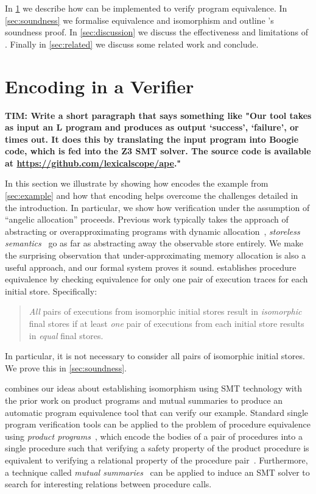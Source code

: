 \documentclass[runningheads,a4paper]{llncs}
\begin{document}
In \cref{sec:impl} we describe how \metho{} can be implemented to verify program equivalence. In \cref{sec:soundness} we formalise equivalence and isomorphism and outline \metho{}'s soundness proof. In \cref{sec:discussion} we discuss the effectiveness and limitations of \metho{}. Finally in \cref{sec:related} we discuss some related work and conclude.

\section{Encoding in a Verifier}\label{sec:impl}


{\bf TIM: Write a short paragraph that says something like "Our tool \tool{}  takes as input an L program  and produces as output `success', `failure', or times out. It does this by translating the input program into Boogie code, which is fed into the Z3 SMT solver. The source code is available at \url{https://github.com/lexicalscope/ape}."} 

In this section we illustrate \metho{} by showing how \tool{} encodes the example from \cref{sec:example} and how that encoding helps overcome the challenges detailed in the introduction. In particular, we show how verification under the assumption of ``angelic allocation'' proceeds.
Previous work typically takes the approach of abstracting or overapproximating programs with dynamic allocation~\cite{Tennent2000,Koutavas2006,Benton2007,Tzevelekos2012}, \emph{storeless semantics}~\cite{Bozga2003} go as far as abstracting away the observable store entirely. We make the surprising observation that under-approximating memory allocation is also a useful approach, and our formal system proves it sound. \metho{} establishes procedure equivalence by checking equivalence for only one pair of execution traces for each initial store. Specifically: \begin{quote}\emph{All} pairs of executions from isomorphic initial stores result in \emph{isomorphic} final stores if at least \emph{one} pair of executions from each initial store results in \emph{equal} final stores.\end{quote} In particular, it is not necessary to consider all pairs of isomorphic initial stores. We prove this in \cref{sec:soundness}.

\metho{} combines our ideas about establishing isomorphism using SMT technology with the prior work on product programs and mutual summaries to produce an automatic program equivalence tool that can verify our example. Standard single program verification tools can be applied to the problem of procedure equivalence using \emph{product programs}~\cite{Barthe2004,Terauchi2005,Godlin09,Lahiri2012,Barthe2016}, which encode the bodies of a pair of procedures into a single procedure such that verifying a safety property of the product procedure is equivalent to verifying a relational property of the procedure pair~\cite{Barthe2016}. Furthermore, a technique called \emph{mutual summaries}~\cite{Hawblitzel2013} can be applied to induce an SMT solver to search for interesting relations between procedure calls.
\end{document}

